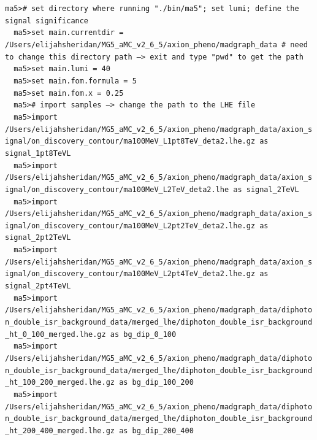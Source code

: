 \documentclass[a4paper, 10pt]{article}
\begin{document}
\texttt{ma5>\# set directory where running "./\-bin/\-ma5"; set lumi; define the signal significance\\
}
\texttt{ }\texttt{ }\texttt{ma5>set main.currentdir = /\-Users/\-elijahsheridan/\-MG5\_aMC\_v2\_6\_5/\-axion\_pheno/\-madgraph\_data \# need to change this directory path --> exit and type "pwd" to get the path\\
}
\texttt{ }\texttt{ }\texttt{ma5>set main.lumi = 40\\
}
\texttt{ }\texttt{ }\texttt{ma5>set main.fom.formula = 5\\
}
\texttt{ }\texttt{ }\texttt{ma5>set main.fom.x = 0.25\\
}
\texttt{ }\texttt{ }\texttt{ma5>\# import samples --> change the path to the LHE file\\
}
\texttt{ }\texttt{ }\texttt{ma5>import /\-Users/\-elijahsheridan/\-MG5\_aMC\_v2\_6\_5/\-axion\_pheno/\-madgraph\_data/\-axion\_signal/\-on\_discovery\_contour/\-ma100MeV\_L1pt8TeV\_deta2.lhe.gz as signal\_1pt8TeVL\\
}
\texttt{ }\texttt{ }\texttt{ma5>import /\-Users/\-elijahsheridan/\-MG5\_aMC\_v2\_6\_5/\-axion\_pheno/\-madgraph\_data/\-axion\_signal/\-on\_discovery\_contour/\-ma100MeV\_L2TeV\_deta2.lhe as signal\_2TeVL\\
}
\texttt{ }\texttt{ }\texttt{ma5>import /\-Users/\-elijahsheridan/\-MG5\_aMC\_v2\_6\_5/\-axion\_pheno/\-madgraph\_data/\-axion\_signal/\-on\_discovery\_contour/\-ma100MeV\_L2pt2TeV\_deta2.lhe.gz as signal\_2pt2TeVL\\
}
\texttt{ }\texttt{ }\texttt{ma5>import /\-Users/\-elijahsheridan/\-MG5\_aMC\_v2\_6\_5/\-axion\_pheno/\-madgraph\_data/\-axion\_signal/\-on\_discovery\_contour/\-ma100MeV\_L2pt4TeV\_deta2.lhe.gz as signal\_2pt4TeVL\\
}
\texttt{ }\texttt{ }\texttt{ma5>import /\-Users/\-elijahsheridan/\-MG5\_aMC\_v2\_6\_5/\-axion\_pheno/\-madgraph\_data/\-diphoton\_double\_isr\_background\_data/\-merged\_lhe/\-diphoton\_double\_isr\_background\_ht\_0\_100\_merged.lhe.gz as bg\_dip\_0\_100\\
}
\texttt{ }\texttt{ }\texttt{ma5>import /\-Users/\-elijahsheridan/\-MG5\_aMC\_v2\_6\_5/\-axion\_pheno/\-madgraph\_data/\-diphoton\_double\_isr\_background\_data/\-merged\_lhe/\-diphoton\_double\_isr\_background\_ht\_100\_200\_merged.lhe.gz as bg\_dip\_100\_200\\
}
\texttt{ }\texttt{ }\texttt{ma5>import /\-Users/\-elijahsheridan/\-MG5\_aMC\_v2\_6\_5/\-axion\_pheno/\-madgraph\_data/\-diphoton\_double\_isr\_background\_data/\-merged\_lhe/\-diphoton\_double\_isr\_background\_ht\_200\_400\_merged.lhe.gz as bg\_dip\_200\_400\\
}
\end{document}
